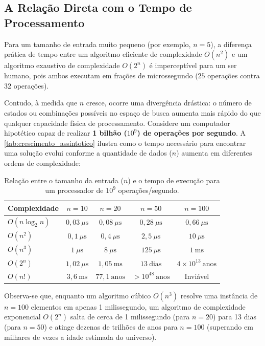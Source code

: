 \subsection*{A Relação Direta com o Tempo de Processamento}

Para um tamanho de entrada muito pequeno (por exemplo, $n = 5$), a diferença prática de tempo entre um algoritmo eficiente de complexidade $O(n^2)$ e um algoritmo exaustivo de complexidade $O(2^n)$ é imperceptível para um ser humano, pois ambos executam em frações de microssegundo ($25$ operações contra $32$ operações). 

Contudo, à medida que $n$ cresce, ocorre uma divergência drástica: o número de estados ou combinações possíveis no espaço de busca aumenta mais rápido do que qualquer capacidade física de processamento. Considere um computador hipotético capaz de realizar \textbf{1 bilhão ($10^9$) de operações por segundo}. A \autoref{tab:crescimento_assintotico} ilustra como o tempo necessário para encontrar uma solução evolui conforme a quantidade de dados ($n$) aumenta em diferentes ordens de complexidade:

\begin{table}[htb]
\centering
\caption{\label{tab:crescimento_assintotico}Relação entre o tamanho da entrada ($n$) e o tempo de execução para um processador de $10^9$ operações/segundo.}
\renewcommand{\arraystretch}{1.3}
\begin{tabular}{|l|c|c|c|c|}
\hline
\rowcolor{gray!20}
\textbf{Complexidade} & \textbf{$n = 10$} & \textbf{$n = 20$} & \textbf{$n = 50$} & \textbf{$n = 100$} \\ \hline
$O(n \log_2 n)$ & $0,03\ \mu\text{s}$ & $0,08\ \mu\text{s}$ & $0,28\ \mu\text{s}$ & $0,66\ \mu\text{s}$ \\ \hline
$O(n^2)$ & $0,1\ \mu\text{s}$ & $0,4\ \mu\text{s}$ & $2,5\ \mu\text{s}$ & $10\ \mu\text{s}$ \\ \hline
$O(n^3)$ & $1\ \mu\text{s}$ & $8\ \mu\text{s}$ & $125\ \mu\text{s}$ & $1\ \text{ms}$ \\ \hline
$O(2^n)$ & $1,02\ \mu\text{s}$ & $1,05\ \text{ms}$ & $13\ \text{dias}$ & $4 \times 10^{13}\ \text{anos}$ \\ \hline
$O(n!)$ & $3,6\ \text{ms}$ & $77,1\ \text{anos}$ & $> 10^{48}\ \text{anos}$ & Inviável \\ \hline
\end{tabular}
\end{table}

Observa-se que, enquanto um algoritmo cúbico $O(n^3)$ resolve uma instância de $n = 100$ elementos em apenas 1 milissegundo, um algoritmo de complexidade exponencial $O(2^n)$ salta de cerca de 1 milissegundo (para $n = 20$) para 13 dias (para $n = 50$) e atinge dezenas de trilhões de anos para $n = 100$ (superando em milhares de vezes a idade estimada do universo). 

